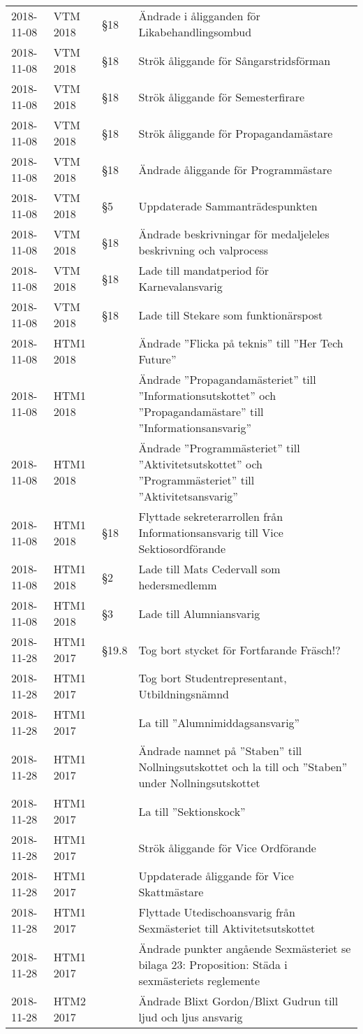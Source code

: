 \documentclass[pdfbookmarks,a4paper,11pt]{article}
\begin{document}
\begin{longtable}{lllp{9cm}}
	2018-11-08 & VTM 2018 & \S18 & Ändrade i åligganden för Likabehandlingsombud\\
	2018-11-08 & VTM 2018 & \S18 & Strök åliggande för Sångarstridsförman\\
	2018-11-08 & VTM 2018 & \S18 & Strök åliggande för Semesterfirare\\
	2018-11-08 & VTM 2018 & \S18 & Strök åliggande för Propagandamästare\\
	2018-11-08 & VTM 2018 & \S18 & Ändrade åliggande för Programmästare\\
	2018-11-08 & VTM 2018 & \S5 & Uppdaterade Sammanträdespunkten\\
	2018-11-08 & VTM 2018 & \S18 & Ändrade beskrivningar för medaljeleles beskrivning och valprocess\\
	2018-11-08 & VTM 2018 & \S18 & Lade till mandatperiod för Karnevalansvarig\\	
	2018-11-08 & VTM 2018 & \S18 & Lade till Stekare som funktionärspost\\	
	2018-11-08 & HTM1 2018 &  & Ändrade ''Flicka på teknis'' till ''Her Tech Future''\\
	2018-11-08 & HTM1 2018 &  & Ändrade ''Propagandamästeriet'' till ''Informationsutskottet'' och ''Propagandamästare'' till ''Informationsansvarig''\\
	2018-11-08 & HTM1 2018 &  & Ändrade ''Programmästeriet'' till ''Aktivitetsutskottet'' och ''Programmästeriet'' till ''Aktivitetsansvarig'' \\
	2018-11-08 & HTM1 2018 & \S18 & Flyttade sekreterarrollen från Informationsansvarig till Vice Sektiosordförande\\
	2018-11-08 & HTM1 2018 & \S2 & Lade till Mats Cedervall som hedersmedlemm\\
	2018-11-08 & HTM1 2018 & \S3 & Lade till Alumniansvarig\\
	2018-11-28 & HTM1 2017 & \S19.8 & Tog bort stycket för Fortfarande Fräsch!?\\
	2018-11-28 & HTM1 2017 & & Tog bort Studentrepresentant, Utbildningsnämnd \\
	2018-11-28 & HTM1 2017 & & La till ''Alumnimiddagsansvarig'' \\
	2018-11-28 & HTM1 2017 & & Ändrade namnet på ''Staben'' till Nollningsutskottet och la till och ''Staben'' under Nollningsutskottet \\
	2018-11-28 & HTM1 2017 & & La till ''Sektionskock'' \\
	2018-11-28 & HTM1 2017 & & Strök åliggande för Vice Ordförande \\
	2018-11-28 & HTM1 2017 & & Uppdaterade åliggande för Vice Skattmästare \\
	2018-11-28 & HTM1 2017 & & Flyttade Utedischoansvarig från Sexmästeriet  till Aktivitetsutskottet\\
	2018-11-28 & HTM1 2017 & & Ändrade punkter angående Sexmästeriet se bilaga 23: Proposition: Städa i sexmästeriets reglemente \\
	2018-11-28 & HTM2 2017 & & Ändrade Blixt Gordon/Blixt Gudrun till ljud och ljus ansvarig\\
    
\end{longtable}
\newpage
\end{document}
